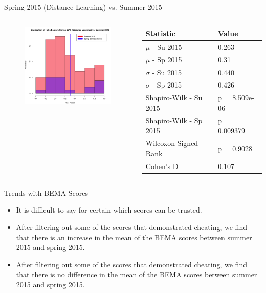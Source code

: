 \documentclass{beamer}
\begin{document}
\begin{frame}{Spring 2015 (Distance Learning) vs. Summer 2015}
\begin{columns}
\begin{column}{2in}
\begin{figure}
	\includegraphics[width=2in]{img/chapter4/hake_su15_vs_sp15d}
\end{figure}
\end{column}
\begin{column}{2in}
\begin{scriptsize}
\begin{table}
  \begin{tabular}{|l|l|}
    \hline
    \textbf{Statistic} & \textbf{Value} \\
	\hline
	$\mu$ - Su 2015 & 0.263 \\
	\hline
	$\mu$ - Sp 2015 & 0.31 \\
	\hline
	$\sigma$ - Su 2015 & 0.440 \\
	\hline
	$\sigma$ - Sp 2015 & 0.426 \\
	\hline
	Shapiro-Wilk - Su 2015 & p = 8.509e-06 \\
	\hline
	Shapiro-Wilk - Sp 2015 & p = 0.009379 \\
	\hline
	Wilcoxon Signed-Rank & p = 0.9028 \\
	\hline
	Cohen's D & 0.107 \\
	\hline
  \end{tabular}
\end{table}
\end{scriptsize}
\end{column}
\end{columns}
\end{frame}

\begin{frame}{Trends with BEMA Scores}
  \begin{itemize}
    \item It is difficult to say for certain which scores can be trusted.
    \item After filtering out some of the scores that demonstrated cheating, we find that there is an increase in the mean of the BEMA scores between summer 2015 and spring 2015.
    \item After filtering out some of the scores that demonstrated cheating, we find that there is no difference in the mean of the BEMA scores between summer 2015 and spring 2015.
  \end{itemize}
\end{frame}
\end{document}

